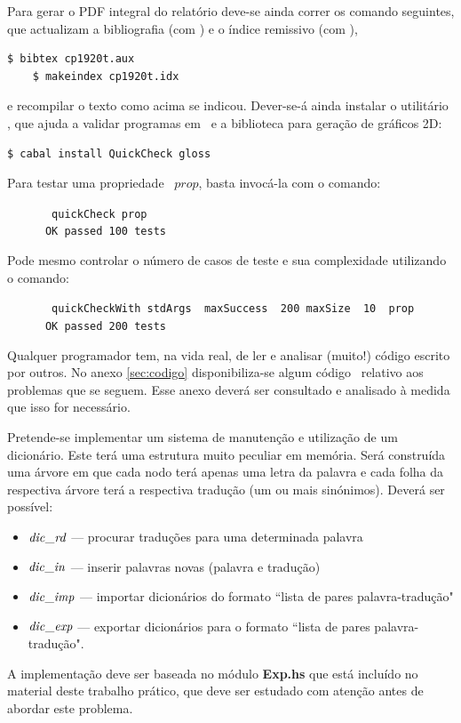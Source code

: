 \documentclass[a4paper]{article}
\newcommand{\Varid}[1]{\mathit{#1}}
\begin{document}
Para gerar o PDF integral do relatório deve-se ainda correr os comando seguintes,
que actualizam a bibliografia (com \Bibtex) e o índice remissivo (com \Makeindex),
\begin{Verbatim}[fontsize=\small]
    $ bibtex cp1920t.aux
    $ makeindex cp1920t.idx
\end{Verbatim}
e recompilar o texto como acima se indicou. Dever-se-á ainda instalar o utilitário
\QuickCheck,
que ajuda a validar programas em \Haskell\ e a biblioteca  para
geração de gráficos 2D:
\begin{Verbatim}[fontsize=\small]
    $ cabal install QuickCheck gloss
\end{Verbatim}
Para testar uma propriedade \QuickCheck~\ensuremath{\Varid{prop}}, basta invocá-la com o comando:
\begin{tabbing}\tt
~~~~~~quickCheck~prop\\
\tt ~~~~~~OK~passed~100~tests
\end{tabbing}
Pode mesmo controlar o número de casos de teste e sua complexidade utilizando
o comando:
\begin{tabbing}\tt
~~~~~~quickCheckWith~stdArgs~~maxSuccess~~200~maxSize~~10~~prop\\
\tt ~~~~~~OK~passed~200~tests
\end{tabbing}
Qualquer programador tem, na vida real, de ler e analisar (muito!) código
escrito por outros. No anexo \ref{sec:codigo} disponibiliza-se algum
código \Haskell\ relativo aos problemas que se seguem. Esse anexo deverá
ser consultado e analisado à medida que isso for necessário.

\Problema

Pretende-se implementar um sistema de manutenção e utilização de um dicionário.
Este terá uma estrutura muito peculiar em memória. Será construída
uma árvore em que cada nodo terá apenas uma letra da palavra e cada
folha da respectiva árvore terá a respectiva tradução (um ou mais sinónimos).
Deverá ser possível:
\begin{itemize}
\item
\ensuremath{\Varid{dic\char95 rd}} --- procurar traduções para uma determinada palavra
\item	
\ensuremath{\Varid{dic\char95 in}} --- inserir palavras novas (palavra e tradução)
\item
\ensuremath{\Varid{dic\char95 imp}} --- importar dicionários do formato ``lista de pares palavra-tradução"
\item
\ensuremath{\Varid{dic\char95 exp}} --- exportar dicionários para o formato ``lista de pares palavra-tradução".
\end{itemize}
A implementação deve ser baseada no módulo \textbf{Exp.hs} que está incluído no material deste trabalho prático,
que deve ser estudado com atenção antes de abordar este problema.
\end{document}
